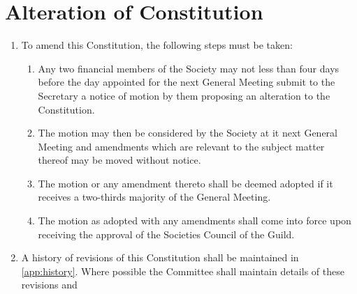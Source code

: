\documentclass[a4paper]{article}
\begin{document}
\section{Alteration of Constitution}
\begin{enumerate}
    \item To amend this Constitution, the following steps must be taken:
    \begin{enumerate}
        \item Any two financial members of the Society may not less than four days before the day appointed for the next General Meeting submit to the Secretary a notice of motion by them proposing an alteration to the Constitution.
        \item The motion may then be considered by the Society at it next General Meeting and amendments which are relevant to the subject matter thereof may be moved without notice.
        \item The motion or any amendment thereto shall be deemed adopted if it receives a two-thirds majority of the General Meeting.
        \item The motion as adopted with any amendments shall come into force upon receiving the approval of the Societies Council of the Guild.
    \end{enumerate}
    \item A history of revisions of this Constitution shall be maintained in \cref{app:history}. Where possible the Committee shall maintain details of these revisions and 
\end{enumerate}
\end{document}
